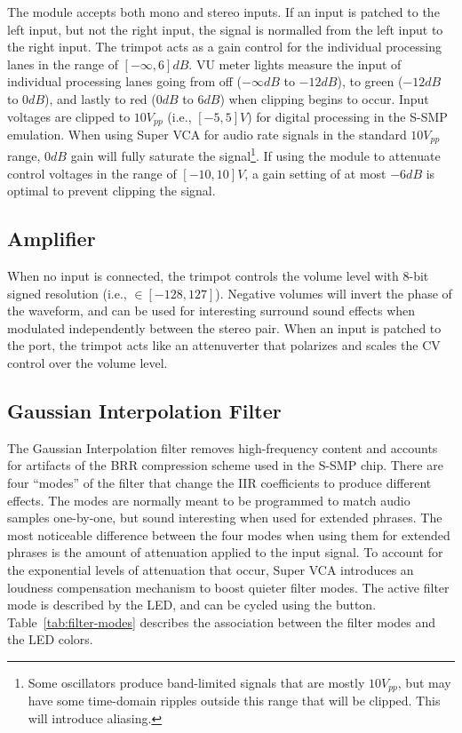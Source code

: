 \documentclass[12pt,letter]{article}
\begin{document}
The module accepts both mono and stereo inputs. If an input is patched to the left input, but not the right input, the signal is normalled from the left input to the right input. The trimpot acts as a gain control for the individual processing lanes in the range of $[-\infty, 6]dB$. VU meter lights measure the input of individual processing lanes going from off ($-\infty dB$ to $-12dB$), to green ($-12dB$ to $0dB$), and lastly to red ($0dB$ to $6dB$) when clipping begins to occur. Input voltages are clipped to $10V_{pp}$ (i.e., $[-5, 5]V$) for digital processing in the S-SMP emulation. When using Super VCA for audio rate signals in the standard $10V_{pp}$ range, $0dB$ gain will fully saturate the signal\footnote{Some oscillators produce band-limited signals that are mostly $10V_{pp}$, but may have some time-domain ripples outside this range that will be clipped. This will introduce aliasing.}. If using the module to attenuate control voltages in the range of $[-10, 10]V$, a gain setting of at most $-6dB$ is optimal to prevent clipping the signal.

\subsection{Amplifier}

When no input is connected, the trimpot controls the volume level with 8-bit signed resolution (i.e., $\in [-128, 127]$). Negative volumes will invert the phase of the waveform, and can be used for interesting surround sound effects when modulated independently between the stereo pair. When an input is patched to the port, the trimpot acts like an attenuverter that polarizes and scales the CV control over the volume level.

\subsection{Gaussian Interpolation Filter}

The Gaussian Interpolation filter removes high-frequency content and accounts for artifacts of the BRR compression scheme used in the S-SMP chip. There are four ``modes'' of the filter that change the IIR coefficients to produce different effects. The modes are normally meant to be programmed to match audio samples one-by-one, but sound interesting when used for extended phrases. The most noticeable difference between the four modes when using them for extended phrases is the amount of attenuation applied to the input signal. To account for the exponential levels of attenuation that occur, Super VCA introduces an loudness compensation mechanism to boost quieter filter modes. The active filter mode is described by the LED, and can be cycled using the button. Table~\ref{tab:filter-modes} describes the association between the filter modes and the LED colors.
\end{document}
